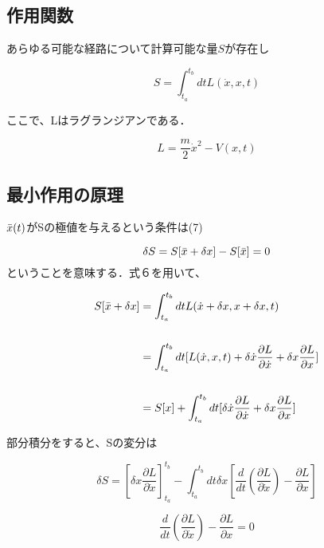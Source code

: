 \documentclass[xelatex,ja=standard,jafont=noto]{bxjsarticle}
\begin{document}
\subsection{作用関数}

あらゆる可能な経路について計算可能な量$S$が存在し

\begin{equation}
    S=\int_{t_{a}}^{t_{b}}dt L(\Dot{x},x,t)
\end{equation}

ここで、Lはラグランジアンである．

\begin{equation}
    L=\frac{m}{2}\Dot{x}^{2}-V(x,t)
\end{equation}

\subsection{最小作用の原理}
$\Bar{x}(t)$がSの極値を与えるという条件は(7)

\begin{equation}
    \delta S=S[\Bar{x}+\delta x]-S[\Bar{x}]=0
\end{equation}
ということを意味する．式６を用いて、

\begin{equation}
    \begin{aligned}
      S[\Bar{x}+\delta x]&=\int_{t_{a}}^{t_{b}}dt L(\Dot{x}+\delta x,x+\delta x,t)\\
      \\
      &=\int_{t_{a}}^{t_{b}}dt [L(\Dot{x},x,t)+\delta\Dot{x}\frac{\partial L}{\partial\Dot{x}}+\delta x\frac{\partial L}{\partial x}]\\
      \\
      &=S[x]+\int_{t_{a}}^{t_{b}}dt[\delta\Dot{x}\frac{\partial L}{\partial\Dot{x}}+\delta x\frac{\partial L}{\partial x}]
    \end{aligned}
\end{equation}

部分積分をすると、Sの変分は

\begin{equation}
    \delta S=[\delta x\frac{\partial L}{\partial\Dot{x}}]^{t_{b}}_{t_{a}}-\int_{t_{a}}^{t_{b}}dt\delta x[\frac{d}{dt}(\frac{\partial L}{\partial\Dot{x}})-\frac{\partial L}{\partial x}]
\end{equation}


\begin{equation}
    \frac{d}{dt}(\frac{\partial L}{\partial\Dot{x}})-\frac{\partial L}{\partial x}=0    
\end{equation}
\end{document}
